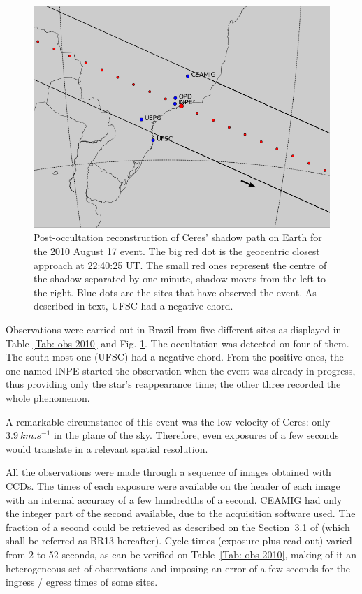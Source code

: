 \documentclass[useAMS,usenatbib]{mn2e}
\begin{document}
\begin{figure}
\includegraphics[scale=0.42]{figures/Ceres_2010.png} 
\caption{Post-occultation reconstruction of Ceres' shadow path on Earth for the 2010 August 17 event. The big red dot is the geocentric closest approach at 22:40:25 UT. The small red ones represent the centre of the shadow separated by one minute, shadow moves from the left to the right. Blue dots are the sites that have observed the event. As described in text, UFSC had a negative chord.
\label{Fig: Ceres-2010-map}}
\end{figure}

Observations were carried out in Brazil from five different sites as displayed in Table \ref{Tab: obs-2010} and Fig. \ref{Fig: Ceres-2010-map}. The occultation was detected on four of them. The south most one (UFSC) had a negative chord. From the positive ones, the one named INPE started the observation when the event was already in progress, thus providing only the star's reappearance time; the other three recorded the whole phenomenon.

A remarkable circumstance of this event was the low velocity of Ceres: only $3.9~km.s^{-1}$ in the plane of the sky. Therefore, even exposures of a few seconds would translate in a relevant spatial resolution.

All the observations were made through a sequence of images obtained with CCDs. The times of each exposure were available on the header of each image with an internal accuracy of a few hundredths of a second. CEAMIG had only the integer part of the second available, due to the acquisition software used. The fraction of a second could be retrieved as described on the Section~3.1 of \cite{BragaRibas2013}  (which shall be referred as BR13 hereafter). Cycle times (exposure plus read-out) varied from 2 to 52 seconds, as can be verified on Table~\ref{Tab: obs-2010}, making of it an heterogeneous set of observations and imposing an error of a few seconds for the ingress / egress times of some sites.
\end{document}
